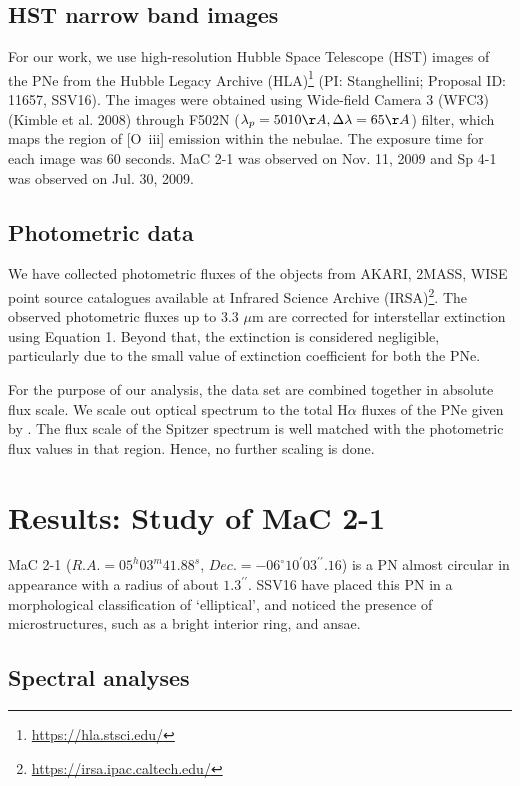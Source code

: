\documentclass[a4paper,fleqn,usenatbib]{mnras}
\begin{document}
\subsection{HST narrow band images} \label{sec:hstimg}
For our work, we use high-resolution Hubble Space Telescope (HST) images of the PNe from the Hubble Legacy Archive (HLA)\footnote{\url{https://hla.stsci.edu/}} (PI: Stanghellini; Proposal ID: 11657, SSV16). The images were obtained using Wide-field Camera 3 (WFC3) (Kimble et al. 2008) through F502N ($\lambda_p=5010\AA, \Delta\lambda=65\AA$) filter, which maps the region of [O~{\sc iii}] emission within the nebulae. The exposure time for each image was 60 seconds. MaC 2-1 was observed on Nov. 11, 2009 and Sp 4-1 was observed on Jul. 30, 2009.

\subsection{Photometric data} \label{sec:photodata}
We have collected photometric fluxes of the objects from AKARI, 2MASS, WISE point source catalogues available at Infrared Science Archive (IRSA)\footnote{\url{https://irsa.ipac.caltech.edu/}}. The observed photometric fluxes up to 3.3 $\mu$m are corrected for interstellar extinction using Equation 1. Beyond that, the extinction is considered negligible, particularly due to the small value of extinction coefficient for both the PNe.

For the purpose of our analysis, the data set are combined together in absolute flux scale. We scale out optical spectrum to the total H$\alpha$ fluxes of the PNe given by \citet{2013MNRAS.431....2F}. The flux scale of the Spitzer spectrum is well matched with the photometric flux values in that region. Hence, no further scaling is done.  

\section{Results: Study of MaC 2-1} \label{sec:mac2-1}
MaC 2-1 ($R.A.=05^h03^m41.88^s$, $Dec.=-06^{\circ}10^{\prime}03^{\prime\prime}.16$) is a PN almost circular in appearance with a radius of about $1.3^{\prime\prime}$. SSV16 have placed this PN in a morphological classification of `elliptical', and noticed the presence of microstructures, such as a bright interior ring, and ansae.  

\subsection{Spectral analyses}
\end{document}
